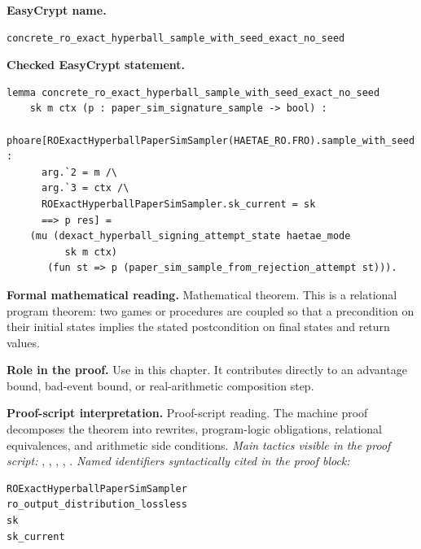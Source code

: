 \begin{formaltheorem}
\noindent\textbf{EasyCrypt name.}
\begin{lstlisting}[language=EasyCrypt,basicstyle=\ttfamily\scriptsize]
concrete_ro_exact_hyperball_sample_with_seed_exact_no_seed
\end{lstlisting}
\noindent\textbf{Checked EasyCrypt statement.}
\begin{lstlisting}[language=EasyCrypt,basicstyle=\ttfamily\scriptsize]
lemma concrete_ro_exact_hyperball_sample_with_seed_exact_no_seed
    sk m ctx (p : paper_sim_signature_sample -> bool) :
  phoare[ROExactHyperballPaperSimSampler(HAETAE_RO.FRO).sample_with_seed :
      arg.`2 = m /\
      arg.`3 = ctx /\
      ROExactHyperballPaperSimSampler.sk_current = sk
      ==> p res] =
    (mu (dexact_hyperball_signing_attempt_state haetae_mode
          sk m ctx)
       (fun st => p (paper_sim_sample_from_rejection_attempt st))).
\end{lstlisting}
\noindent\textbf{Formal mathematical reading.}
Mathematical theorem. This is a relational program theorem: two games or procedures are coupled so that a precondition on their initial states implies the stated postcondition on final states and return values.

\noindent\textbf{Role in the proof.}
Use in this chapter. It contributes directly to an advantage bound, bad-event bound, or real-arithmetic composition step.

\noindent\textbf{Proof-script interpretation.}
Proof-script reading. The machine proof decomposes the theorem into rewrites, program-logic obligations, relational equivalences, and arithmetic side conditions.
\emph{Main tactics visible in the proof script:} , , , , .
\emph{Named identifiers syntactically cited in the proof block:}
\begin{lstlisting}[language=EasyCrypt,basicstyle=\ttfamily\scriptsize]
ROExactHyperballPaperSimSampler
ro_output_distribution_lossless
sk
sk_current
\end{lstlisting}

\end{formaltheorem}

